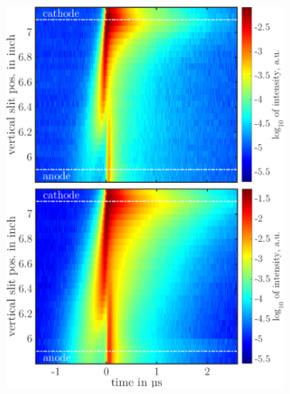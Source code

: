 \documentclass[a4paper,10pt,twoside]{article}
\begin{document}
			\begin{figure}
				\centering
				\begin{subfigure}[t]{0.49\textwidth}
					\includegraphics[width=\textwidth]{figures/lineratio/667u706.pdf}
					\caption*{}
					\label{img:667u706nm}
				\end{subfigure}
				\hfill
				\begin{subfigure}[t]{0.49\textwidth}

\end{subfigure}
\end{figure}
\end{document}
